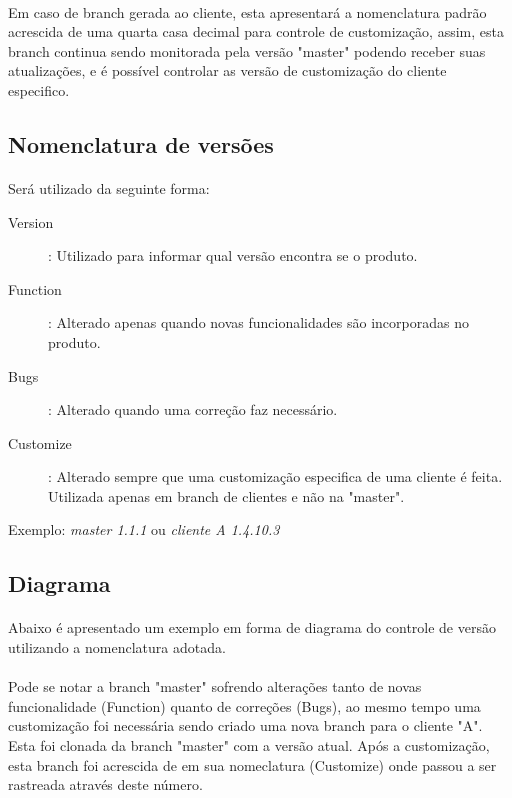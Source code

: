 \documentclass[	DIV=calc,%
							paper=a4,%
							fontsize=12pt,%
							onecolumn]{scrartcl}	 					%
\begin{document}
\paragraph{}
Em caso de branch gerada ao cliente, esta apresentará a nomenclatura padrão acrescida de uma quarta casa decimal para controle de customização, assim, esta branch continua sendo monitorada pela versão "master" podendo receber suas atualizações, e é possível controlar as versão de customização do cliente especifico.

\subsection{Nomenclatura de versões}
\paragraph{}
Será utilizado da seguinte forma:

\begin{description}
	\item [Version]: Utilizado para informar qual versão encontra se o produto.
	\item [Function]: Alterado apenas quando novas funcionalidades são incorporadas no produto.
	\item [Bugs]: Alterado quando uma correção faz necessário.
	\item [Customize]: Alterado sempre que uma customização especifica de uma cliente é feita. Utilizada apenas em branch de clientes e não na "master".
\end{description}

Exemplo:
\textit{master 1.1.1 }
ou
\textit{cliente A 1.4.10.3}

\subsection{Diagrama}
\paragraph{}
Abaixo é apresentado um exemplo em forma de diagrama do controle de versão utilizando a nomenclatura adotada.
\paragraph{}
Pode se notar a branch "master" sofrendo alterações tanto de novas funcionalidade (Function) quanto de correções (Bugs), ao mesmo tempo uma customização foi necessária sendo criado uma nova branch para o cliente "A". Esta foi clonada da branch "master" com a versão atual. Após a customização, esta branch foi acrescida de em sua nomeclatura (Customize) onde passou a ser rastreada através deste número. 
\end{document}
